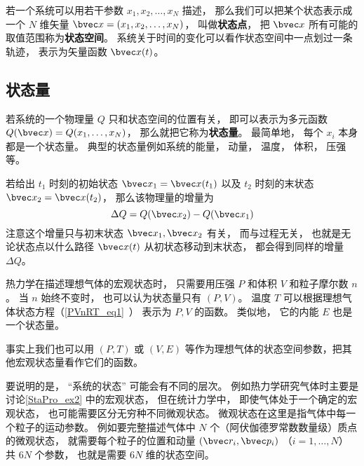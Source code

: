 

若一个系统可以用若干参数 $x_1, x_2,  \dots, x_N$ 描述， 那么我们可以把某个状态表示成一个 $N$ 维矢量 $\bvec x = (x_1, x_2, \dots, x_N)$， 叫做\textbf{状态点}， 把 $\bvec x$ 所有可能的取值范围称为\textbf{状态空间}。 系统关于时间的变化可以看作状态空间中一点划过一条轨迹， 表示为矢量函数 $\bvec x(t)$。

\subsection{状态量}
若系统的一个物理量 $Q$ 只和状态空间的位置有关， 即可以表示为多元函数 $Q(\bvec x) = Q(x_1, \dots, x_N)$， 那么就把它称为\textbf{状态量}。 最简单地， 每个 $x_i$ 本身都是一个状态量。 典型的状态量例如系统的能量， 动量， 温度， 体积， 压强等。

若给出 $t_1$ 时刻的初始状态 $\bvec x_1 = \bvec x(t_1)$ 以及 $t_2$ 时刻的末状态 $\bvec x_2 = \bvec x(t_2)$， 那么该物理量的增量为
\begin{equation}
\Delta Q = Q(\bvec x_2) - Q(\bvec x_1)
\end{equation}
注意这个增量只与初末状态 $\bvec x_1,\bvec x_2$ 有关， 而与过程无关， 也就是无论状态点以什么路径 $\bvec x(t)$ 从初状态移动到末状态， 都会得到同样的增量 $\Delta Q$。

\begin{example}{}\label{StaPro_ex2}
热力学在描述理想气体的宏观状态时， 只需要用压强 $P$ 和体积 $V$ 和粒子摩尔数 $n$。 当 $n$ 始终不变时， 也可以认为状态量只有 $(P,V)$。 温度 $T$ 可以根据理想气体状态方程（\autoref{PVnRT_eq1}~） 表示为 $P,V$ 的函数。 类似地， 它的内能 $E$ 也是一个状态量。

事实上我们也可以用 $(P,T)$ 或 $(V,E)$ 等作为理想气体的状态空间参数，把其他宏观状态量看作它们的函数。
\end{example}

要说明的是， “系统的状态” 可能会有不同的层次。 例如热力学研究气体时主要是讨论\autoref{StaPro_ex2} 中的宏观状态， 但在统计力学中， 即使气体处于一个确定的宏观状态， 也可能需要区分无穷种不同微观状态。 微观状态在这里是指气体中每一个粒子的运动参数。 例如要完整描述气体中 $N$ 个（阿伏伽德罗常数数量级）质点的微观状态， 就需要每个粒子的位置和动量 $(\bvec r_i, \bvec p_i)$ （$i=1,\dots,N$） 共 $6N$ 个参数， 也就是需要 $6N$ 维的状态空间。

